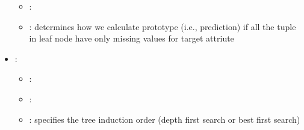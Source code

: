 \begin{itemize}
\begin{itemize}
                \item \optionDefaultValue{}: 
                \item \optionDescrption{}: determines how we calculate prototype (i.e., prediction) if all the tuple in leaf node have only missing values for target attriute 
           \end{itemize}
    \item {}:
           \begin{itemize}
                \item \optionPossibleValues{}: 
                \item \optionDefaultValue{}: 
                \item \optionDescrption{}: specifies the tree induction order (depth first search or best first search)
           \end{itemize}
\end{itemize}
